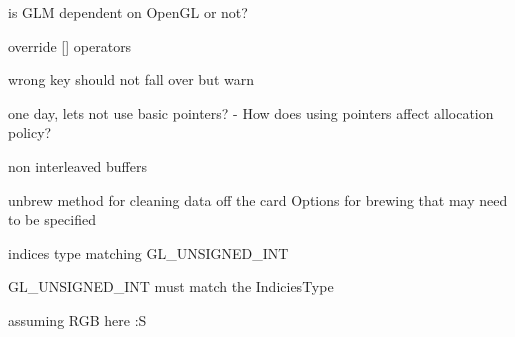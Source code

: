 
\begin{DoxyRefList}
\item[\label{todo__todo000023}%
\hypertarget{todo__todo000023}{}%
\-Namespace \hyperlink{namespaces9}{s9} ]is \-G\-L\-M dependent on \-Open\-G\-L or not?  
\item[\label{todo__todo000013}%
\hypertarget{todo__todo000013}{}%
\-Class \hyperlink{classs9_1_1AllocationPolicyNew}{s9\-:\-:\-Allocation\-Policy\-New} ]override \mbox{[}\mbox{]} operators  
\item[\label{todo__todo000012}%
\hypertarget{todo__todo000012}{}%
\-Member \hyperlink{classs9_1_1compvis_1_1ProcessBlock_a2189359475f02db5e99e699a4a9a5fa0}{s9\-:\-:compvis\-:\-:\-Process\-Block\-:\-:get\-Value} (std\-::string tag)]wrong key should not fall over but warn  
\item[\label{todo__todo000014}%
\hypertarget{todo__todo000014}{}%
\-Member \hyperlink{classs9_1_1GeometryT_a74be427b554991e3a771b07c101185f2}{s9\-:\-:\-Geometry\-T$<$ \-Vertex\-Type, \-Face\-Type, \-Allocation\-Policy $>$\-:\-:indices} ()]one day, lets not use basic pointers? -\/ \-How does using pointers affect allocation policy?  
\item[\label{todo__todo000018}%
\hypertarget{todo__todo000018}{}%
\-Member \hyperlink{classs9_1_1gl_1_1Drawable_ac45a196466c96705860cff9f8898673f}{s9\-:\-:gl\-:\-:\-Drawable\-:\-:brew} (\-Geometry\-T$<$ Vertex\-Type, Face\-Type, Allocation\-Policy $>$ \&g, \-Brew\-Flags b=\-Brew\-Flags\-Default)]non interleaved buffers  
\item[\label{todo__todo000016}%
\hypertarget{todo__todo000016}{}%
\-Member \hyperlink{classs9_1_1gl_1_1Drawable_a17009f367a17d45ac7f9245b15229c95}{s9\-:\-:gl\-:\-:\-Drawable\-:\-:draw} (\-Geometry\-T$<$ Vertex\-Type, Face\-Type, Allocation\-Policy $>$ \&g, \-Geometry\-Primitive gp)]unbrew method for cleaning data off the card \-Options for brewing that may need to be specified 

indices type matching \-G\-L\-\_\-\-U\-N\-S\-I\-G\-N\-E\-D\-\_\-\-I\-N\-T  
\item[\label{todo__todo000019}%
\hypertarget{todo__todo000019}{}%
\-Member \hyperlink{classs9_1_1gl_1_1Drawable_a82268b69a4127ccea73e20d14e9a4835}{s9\-:\-:gl\-:\-:\-Drawable\-:\-:set\-Pointers} (\-Geometry\-T$<$ Vertex4, Face4, Allocation\-Policy $>$ \&g, \-Brew\-Flags b)]\-G\-L\-\_\-\-U\-N\-S\-I\-G\-N\-E\-D\-\_\-\-I\-N\-T must match the \-Indicies\-Type  
\item[\label{todo__todo000001}%
\hypertarget{todo__todo000001}{}%
\-Member \hyperlink{classs9_1_1gl_1_1Texture_a169bf6c0f7958eee33cf1d60ba0c7806}{s9\-:\-:gl\-:\-:\-Texture\-:\-:\-Texture} (const \-Image \&image)]assuming \-R\-G\-B here \-:\-S 


\end{DoxyRefList}

